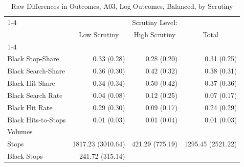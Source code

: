 \begin{table}[!h]
\caption{Raw Differences in Outcomes, A03, Log Outcomes, Balanced, by Scrutiny}
\centering
\begin{tabular}{llll}
\cline{1-4}
\multicolumn{1}{r}{} &
  \multicolumn{3}{c}{Scrutiny Level:} \\
\multicolumn{1}{r}{} &
  \multicolumn{1}{c}{Low Scrutiny} &
  \multicolumn{1}{c}{High Scrutiny} &
  \multicolumn{1}{c}{Total} \\
\cline{1-4}
\multicolumn{1}{l}{Rates} &
  \multicolumn{1}{r}{} &
  \multicolumn{1}{r}{} &
  \multicolumn{1}{r}{} \\
\multicolumn{1}{l}{\hspace{1em}Black Stop-Share} &
  \multicolumn{1}{r}{0.33 (0.28)} &
  \multicolumn{1}{r}{0.28 (0.20)} &
  \multicolumn{1}{r}{0.31 (0.25)} \\
\multicolumn{1}{l}{\hspace{1em}Black Search-Share} &
  \multicolumn{1}{r}{0.36 (0.30)} &
  \multicolumn{1}{r}{0.42 (0.32)} &
  \multicolumn{1}{r}{0.38 (0.31)} \\
\multicolumn{1}{l}{\hspace{1em}Black Hit-Share} &
  \multicolumn{1}{r}{0.34 (0.34)} &
  \multicolumn{1}{r}{0.50 (0.42)} &
  \multicolumn{1}{r}{0.37 (0.36)} \\
\multicolumn{1}{l}{\hspace{1em}Black Search Rate} &
  \multicolumn{1}{r}{0.04 (0.08)} &
  \multicolumn{1}{r}{0.12 (0.25)} &
  \multicolumn{1}{r}{0.07 (0.17)} \\
\multicolumn{1}{l}{\hspace{1em}Black Hit Rate} &
  \multicolumn{1}{r}{0.29 (0.30)} &
  \multicolumn{1}{r}{0.09 (0.17)} &
  \multicolumn{1}{r}{0.24 (0.29)} \\
\multicolumn{1}{l}{\hspace{1em}Black Hits-to-Stops} &
  \multicolumn{1}{r}{0.01 (0.03)} &
  \multicolumn{1}{r}{0.01 (0.04)} &
  \multicolumn{1}{r}{0.01 (0.03)} \\
\multicolumn{1}{l}{Volumes} &
  \multicolumn{1}{r}{} &
  \multicolumn{1}{r}{} &
  \multicolumn{1}{r}{} \\
\multicolumn{1}{l}{\hspace{1em}Stops} &
  \multicolumn{1}{r}{1817.23 (3010.64)} &
  \multicolumn{1}{r}{421.29 (775.19)} &
  \multicolumn{1}{r}{1295.45 (2521.22)} \\
\multicolumn{1}{l}{\hspace{1em}Black Stops} &
  \multicolumn{1}{r}{241.72 (315.14)} &

\end{tabular}
\end{table}

